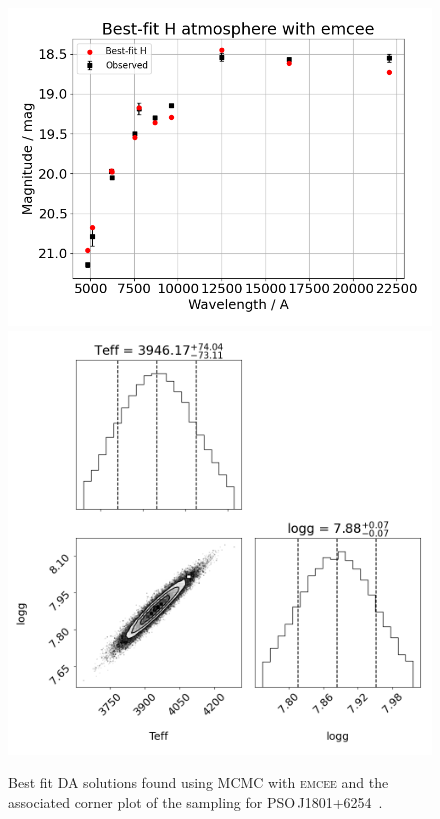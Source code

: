 \documentclass[fleqn,usenatbib]{rasti}
\begin{document}
\begin{figure}
    \centering
    \includegraphics[width=\columnwidth]{fig_02_PSOJ1801p6254_emcee.png}
    \includegraphics[width=\columnwidth]{fig_02_PSOJ1801p6254_emcee_corner.png}
    \caption{Best fit DA solutions found using MCMC with \textsc{emcee} and the associated corner plot of the
    sampling for PSO\,J1801+6254~\citep[][they found a spectroscopic of T$_\mathrm{eff}=3550$\,K]{2020MNRAS.493.6001L}.}
    \label{fig:best_fit}
\end{figure}
\end{document}
